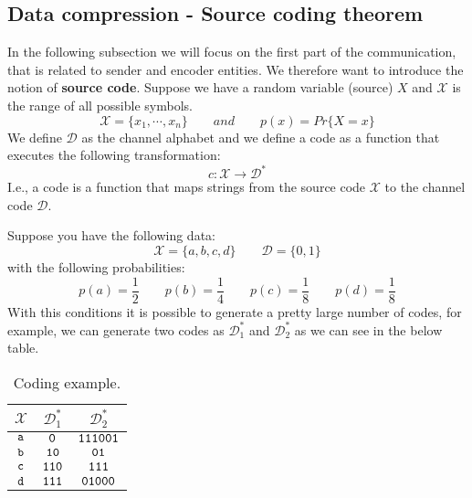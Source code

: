 \subsection{Data compression - Source coding theorem}
In the following subsection we will focus on the first part of the communication, that is related to sender and encoder entities. We therefore want to introduce the notion of \textbf{source code}.
Suppose we have a random variable (source) $X$ and $\mathcal{X}$ is the range of all possible symbols.
$$\mathcal{X} = \{x_1, \cdots, x_n\} \qquad and \qquad p(x) = Pr\{X=x\}$$
We define $\mathcal{D}$ as the channel alphabet and we define a code as a function that executes the following transformation:
$$c : \mathcal{X} \rightarrow \mathcal{D}^*$$
I.e., a code is a function that maps strings from the source code $\mathcal{X}$ to the channel code $\mathcal{D}$.
\begin{exmp} Suppose you have the following data:
	$$\mathcal{X} = \{a, b, c, d\} \qquad \mathcal{D} = \{0,1\}$$
	with the following probabilities:
	$$p(a) = \frac{1}{2} \qquad p(b) = \frac{1}{4} \qquad p(c) = \frac{1}{8} \qquad p(d) = \frac{1}{8}$$
	With this conditions it is possible to generate a pretty large number of codes, for example, we can generate two codes as $\mathcal{D}^*_1$ and $\mathcal{D}^*_2$ as we can see in the below table.
	\begin{table}[H]
		\centering
		\begin{tabular}{| c | c | c |}
			\hline
			$\mathcal{X}$ & $\mathcal{D}^*_1$ & $\mathcal{D}^*_2$\\\hline
			$\verb|a|$ & $\verb|0|$ & $\verb|111001|$ \\
			$\verb|b|$ & $\verb|10|$ & $\verb|01|$ \\
			$\verb|c|$ & $\verb|110|$ & $\verb|111|$ \\
			$\verb|d|$ & $\verb|111|$ & $\verb|01000|$ \\
			\hline
		\end{tabular}
		\caption{Coding example.}
	\end{table}
\end{exmp}

